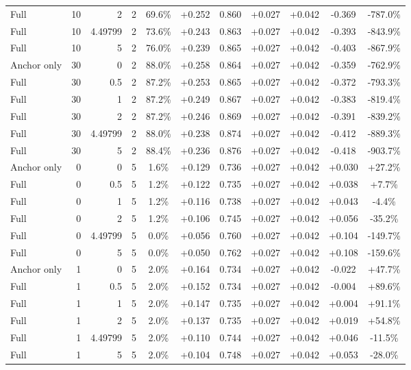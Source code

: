 \begin{table}[htbp]
\begin{tabular}{lrrrccccccc}
Full & 10 & 2 & 2 & 69.6\% & +0.252 & 0.860 & +0.027 & +0.042 & -0.369 & -787.0\% \\
Full & 10 & 4.49799 & 2 & 73.6\% & +0.243 & 0.863 & +0.027 & +0.042 & -0.393 & -843.9\% \\
Full & 10 & 5 & 2 & 76.0\% & +0.239 & 0.865 & +0.027 & +0.042 & -0.403 & -867.9\% \\
Anchor only & 30 & 0 & 2 & 88.0\% & +0.258 & 0.864 & +0.027 & +0.042 & -0.359 & -762.9\% \\
Full & 30 & 0.5 & 2 & 87.2\% & +0.253 & 0.865 & +0.027 & +0.042 & -0.372 & -793.3\% \\
Full & 30 & 1 & 2 & 87.2\% & +0.249 & 0.867 & +0.027 & +0.042 & -0.383 & -819.4\% \\
Full & 30 & 2 & 2 & 87.2\% & +0.246 & 0.869 & +0.027 & +0.042 & -0.391 & -839.2\% \\
Full & 30 & 4.49799 & 2 & 88.0\% & +0.238 & 0.874 & +0.027 & +0.042 & -0.412 & -889.3\% \\
Full & 30 & 5 & 2 & 88.4\% & +0.236 & 0.876 & +0.027 & +0.042 & -0.418 & -903.7\% \\
Anchor only & 0 & 0 & 5 & 1.6\% & +0.129 & 0.736 & +0.027 & +0.042 & +0.030 & +27.2\% \\
Full & 0 & 0.5 & 5 & 1.2\% & +0.122 & 0.735 & +0.027 & +0.042 & +0.038 & +7.7\% \\
Full & 0 & 1 & 5 & 1.2\% & +0.116 & 0.738 & +0.027 & +0.042 & +0.043 & -4.4\% \\
Full & 0 & 2 & 5 & 1.2\% & +0.106 & 0.745 & +0.027 & +0.042 & +0.056 & -35.2\% \\
Full & 0 & 4.49799 & 5 & 0.0\% & +0.056 & 0.760 & +0.027 & +0.042 & +0.104 & -149.7\% \\
Full & 0 & 5 & 5 & 0.0\% & +0.050 & 0.762 & +0.027 & +0.042 & +0.108 & -159.6\% \\
Anchor only & 1 & 0 & 5 & 2.0\% & +0.164 & 0.734 & +0.027 & +0.042 & -0.022 & +47.7\% \\
Full & 1 & 0.5 & 5 & 2.0\% & +0.152 & 0.734 & +0.027 & +0.042 & -0.004 & +89.6\% \\
Full & 1 & 1 & 5 & 2.0\% & +0.147 & 0.735 & +0.027 & +0.042 & +0.004 & +91.1\% \\
Full & 1 & 2 & 5 & 2.0\% & +0.137 & 0.735 & +0.027 & +0.042 & +0.019 & +54.8\% \\
Full & 1 & 4.49799 & 5 & 2.0\% & +0.110 & 0.744 & +0.027 & +0.042 & +0.046 & -11.5\% \\
Full & 1 & 5 & 5 & 2.0\% & +0.104 & 0.748 & +0.027 & +0.042 & +0.053 & -28.0\% \\

\end{tabular}
\end{table}
